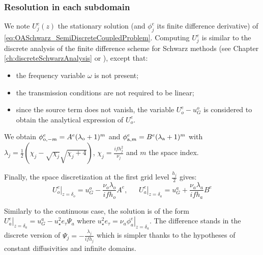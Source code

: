 \subsubsection{Resolution in each subdomain}
\label{sec:OASchwarz_SteadyStateInner}
We note $U_j^e(z)$ the stationary solution (and ${\phi}_j^e$ its finite difference derivative) of
\eqref{eq:OASchwarz_SemiDiscreteCoupledProblem}.
Computing $U_j^e$ is similar
to the discrete analysis of the finite difference scheme for
Schwarz methods (see Chapter \ref{ch:discreteSchwarzAnalysis} or
\cite{wu_optimized_2017}),
except that:
\begin{itemize}
	\item the frequency variable $\omega$ is not present;
	\item the transmission conditions are not required to
		be linear;
	\item since the source term does not vanish,
		the variable $U^e_o - u_G^o$ is considered
		to obtain the analytical expression of $U^e_o$.
\end{itemize}
We obtain
$\phi_{{\rm o}, -m}^e = A^e
(\lambda_{\rm o}+1)^m$
and
$\phi_{{\rm a}, m}^e = B^e
(\lambda_{\rm a}+1)^m$ 
with $\lambda_j = \frac{1}{2}\left(\chi_j - \sqrt{\chi_j} \sqrt{\chi_j + 4}\right)$, 
$\chi_j=\frac{i f h_j^2}{\nu_j}$
and $m$ the space index.
\par
Finally, the space discretization at the first grid level
$\frac{h_j}{2}$ gives:
\begin{equation}
		\left.{U}^e_o\right|_{z=\delta_o} =
u_G^o - \frac{\nu_o\lambda_o}{if h_o} A^e, ~~~~~~~
		\left.{U}^e_a\right|_{z=\delta_a} =
u_G^a + \frac{\nu_a\lambda_a}{if h_a} B^e
\end{equation}
\begin{remark}
Similarly to the continuous case, the solution is of the form
	$\left.{U}^e_a\right|_{z=\delta_a} = u_G^a -
	u_\star^2 e_{\tau}\Psi_a$
	where $u_\star^2 e_{\tau} =
	\left.\nu_a \phi_a^e\right|_{z=\delta_a}$.
The difference stands in the discrete version of
$\Psi_j = -\frac{\lambda_j}{if h_j}$
which is simpler thanks to the hypotheses of constant diffusivities
and infinite domains.
\end{remark}
